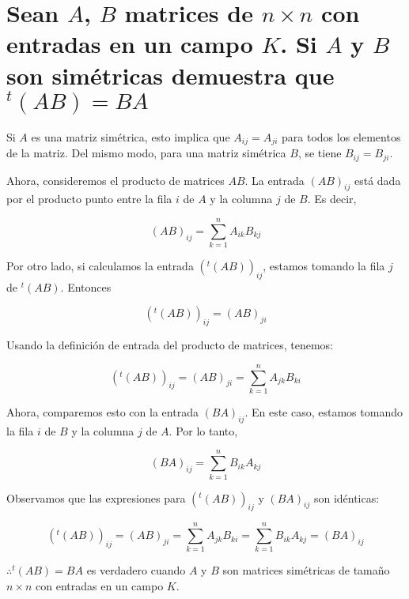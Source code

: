 \section{Sean $A$, $B$ matrices de $n \times n$ con entradas en un campo $K$. Si $A$ y $B$ son simétricas demuestra que $^t(AB)=BA$}

Si $A$ es una matriz simétrica, esto implica que $A_{ij} = A_{ji}$ para todos los elementos de la matriz. Del mismo modo, para una matriz simétrica $B$, se tiene $B_{ij} = B_{ji}$.

Ahora, consideremos el producto de matrices $AB$. La entrada $(AB)_{ij}$ está dada por el producto punto entre la fila $i$ de $A$ y la columna $j$ de $B$. Es decir,

$$(AB)_{ij} = \sum_{k=1}^{n} A_{ik}B_{kj}$$

Por otro lado, si calculamos la entrada $(^t(AB))_{ij}$, estamos tomando la fila $j$ de $^t(AB)$. Entonces

$$(^t(AB))_{ij} = (AB)_{ji}$$

Usando la definición de entrada del producto de matrices, tenemos:

$$(^t(AB))_{ij} = (AB)_{ji} = \sum_{k=1}^{n} A_{jk}B_{ki}$$

Ahora, comparemos esto con la entrada $(BA)_{ij}$. En este caso, estamos tomando la fila $i$ de $B$ y la columna $j$ de $A$. Por lo tanto,

$$(BA)_{ij} = \sum_{k=1}^{n} B_{ik}A_{kj}$$

Observamos que las expresiones para $(^t(AB))_{ij}$ y $(BA)_{ij}$ son idénticas:

$$(^t(AB))_{ij} = (AB)_{ji} = \sum_{k=1}^{n} A_{jk}B_{ki} = \sum_{k=1}^{n} B_{ik}A_{kj} = (BA)_{ij}$$

$\therefore ^t(AB) = BA $ es verdadero cuando $A$ y $B$ son matrices simétricas de tamaño $n \times n$ con entradas en un campo $K$.


